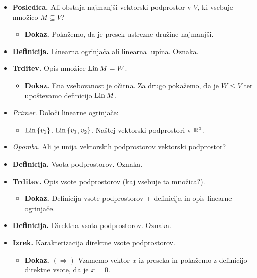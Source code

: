 \begin{enumerate}
\begin{itemize}
\begin{itemize}
        \end{itemize}
        \item \colorbox{orange!30}{\textbf{Posledica.}} Ali obstaja najmanjši vektorski podprostor v $V$, ki vsebuje množico $M \subseteq V$?
        \begin{itemize}
            \item \colorbox{green!30}{\textbf{Dokaz.}} Pokažemo, da je presek ustrezne družine najmanjši.
        \end{itemize}
        \item \colorbox{purple!30}{\textbf{Definicija.}} Linearna ogrinjača ali linearna lupina. Oznaka.
        \item \colorbox{blue!30}{\textbf{Trditev.}} Opis množice $\operatorname{Lin} M = W$.
        \begin{itemize}
            \item \colorbox{green!30}{\textbf{Dokaz.}} Ena vsebovanost je očitna. Za drugo pokažemo, da je $W \leq V$ ter upoštevamo definicijo $\operatorname{Lin} M$.
        \end{itemize}
        \item \colorbox{yellow!30}{\emph{Primer.}} Določi linearne ogrinjače:        
        \begin{itemize} 
            \item $\operatorname{Lin} \left\{v_1\right\}$.
            $\operatorname{Lin} \left\{v_1, v_2\right\}$.            
            Naštej vektorski podprostori v $\mathbb{R}^3$.
        \end{itemize}
        \item \colorbox{yellow!30}{\emph{Opomba.}} Ali je unija vektorskih podprostorov vektorski podprostor?
        \item \colorbox{purple!30}{\textbf{Definicija.}} Vsota podprostorov. Oznaka.
        \item \colorbox{blue!30}{\textbf{Trditev.}} Opis vsote podprostorov (kaj vsebuje ta množica?).
        \begin{itemize}
            \item \colorbox{green!30}{\textbf{Dokaz.}} Definicija vsote podprostorov + definicija in opis linearne ogrinjače.
        \end{itemize}
        \item \colorbox{purple!30}{\textbf{Definicija.}} Direktna vsota podprostorov. Oznaka.
        \item \colorbox{blue!30}{\textbf{Izrek.}} Karakterizacija direktne vsote podprostorov.
        \begin{itemize}
            \item \colorbox{green!30}{\textbf{Dokaz.}} $(\Rightarrow)$ Vzamemo vektor $x$ iz preseka in pokažemo z definicijo direktne vsote, da je $x=0$.
            

\end{itemize}
\end{itemize}
\end{enumerate}
